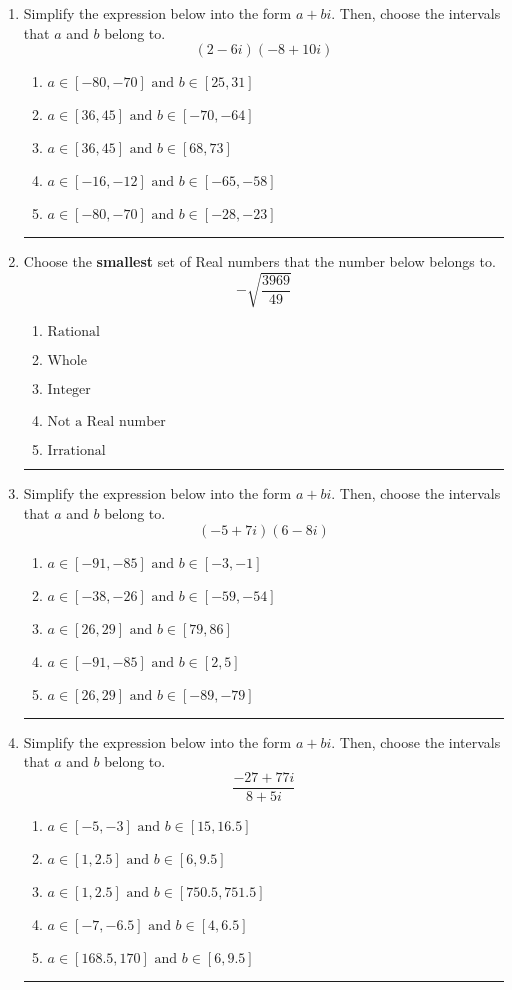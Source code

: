 \documentclass[14pt]{extbook}
\newcommand{\litem}[1]{\item#1\hspace*{-1cm}\rule{\textwidth}{0.4pt}}
\begin{document}
\begin{enumerate}
\litem{
Simplify the expression below into the form $a+bi$. Then, choose the intervals that $a$ and $b$ belong to.\[ (2 - 6 i)(-8 + 10 i) \]\begin{enumerate}[label=\Alph*.]
\item \( a \in [-80, -70] \text{ and } b \in [25, 31] \)
\item \( a \in [36, 45] \text{ and } b \in [-70, -64] \)
\item \( a \in [36, 45] \text{ and } b \in [68, 73] \)
\item \( a \in [-16, -12] \text{ and } b \in [-65, -58] \)
\item \( a \in [-80, -70] \text{ and } b \in [-28, -23] \)

\end{enumerate} }
\litem{
Choose the \textbf{smallest} set of Real numbers that the number below belongs to.\[ -\sqrt{\frac{3969}{49}} \]\begin{enumerate}[label=\Alph*.]
\item \( \text{Rational} \)
\item \( \text{Whole} \)
\item \( \text{Integer} \)
\item \( \text{Not a Real number} \)
\item \( \text{Irrational} \)

\end{enumerate} }
\litem{
Simplify the expression below into the form $a+bi$. Then, choose the intervals that $a$ and $b$ belong to.\[ (-5 + 7 i)(6 - 8 i) \]\begin{enumerate}[label=\Alph*.]
\item \( a \in [-91, -85] \text{ and } b \in [-3, -1] \)
\item \( a \in [-38, -26] \text{ and } b \in [-59, -54] \)
\item \( a \in [26, 29] \text{ and } b \in [79, 86] \)
\item \( a \in [-91, -85] \text{ and } b \in [2, 5] \)
\item \( a \in [26, 29] \text{ and } b \in [-89, -79] \)

\end{enumerate} }
\litem{
Simplify the expression below into the form $a+bi$. Then, choose the intervals that $a$ and $b$ belong to.\[ \frac{-27 + 77 i}{8 + 5 i} \]\begin{enumerate}[label=\Alph*.]
\item \( a \in [-5, -3] \text{ and } b \in [15, 16.5] \)
\item \( a \in [1, 2.5] \text{ and } b \in [6, 9.5] \)
\item \( a \in [1, 2.5] \text{ and } b \in [750.5, 751.5] \)
\item \( a \in [-7, -6.5] \text{ and } b \in [4, 6.5] \)
\item \( a \in [168.5, 170] \text{ and } b \in [6, 9.5] \)


\end{enumerate}}
\end{enumerate}
\end{document}
